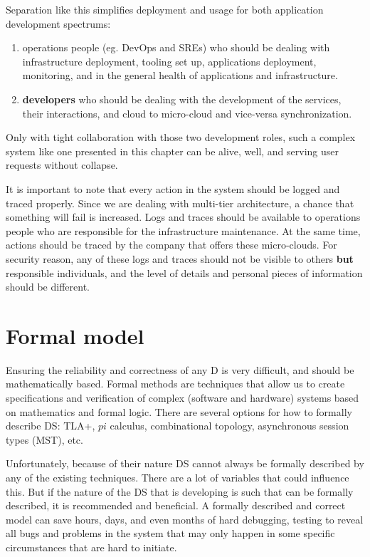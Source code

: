 Separation like this simplifies deployment and usage for both application development spectrums: 

\begin{enumerate}[start=1,label={(\bfseries \roman*)}]
	\item operations people (eg. DevOps and SREs) who should be dealing with infrastructure deployment, tooling set up, applications deployment, monitoring, and in the general health of applications and infrastructure.
	\item \textbf{developers} who should be dealing with the development of the services, their interactions, and cloud to micro-cloud and vice-versa synchronization.
\end{enumerate}

\noindent
Only with tight collaboration with those two development roles, such a complex system like one presented in this chapter can be alive, well, and serving user requests without collapse.

It is important to note that every action in the system should be logged and traced properly. Since we are dealing with multi-tier architecture, a chance that something will fail is increased. Logs and traces should be available to operations people who are responsible for the infrastructure maintenance. At the same time, actions should be traced by the company that offers these micro-clouds. For security reason, any of these logs and traces should not be visible to others \textbf{but} responsible individuals, and the level of details and personal pieces of information should be different.
%
%
\section{Formal model}\label{sec:formal_model}
%
Ensuring the reliability and correctness of any D is very difficult, and should be mathematically based. Formal methods are techniques that allow us to create specifications and verification of complex (software and hardware) systems based on mathematics and formal logic. There are several options for how to formally describe DS: TLA+, $pi$ calculus, combinational topology, asynchronous session types (MST), etc. 

Unfortunately, because of their nature DS cannot always be formally described by any of the existing techniques. There are a lot of variables that could influence this. But if the nature of the DS that is developing is such that can be formally described, it is recommended and beneficial. A formally described and correct model can save hours, days, and even months of hard debugging, testing to reveal all bugs and problems in the system that may only happen in some specific circumstances that are hard to initiate.

